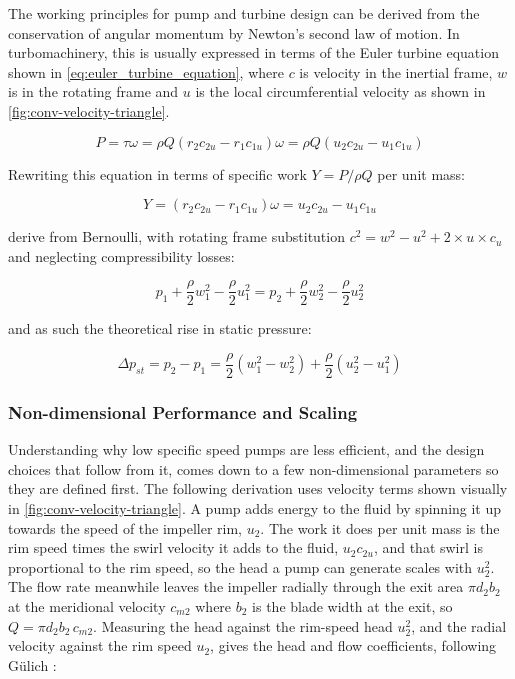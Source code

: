 The working principles for pump and turbine design can be derived from the conservation of angular momentum by Newton's second law of motion. In turbomachinery, this is usually expressed in terms of the Euler turbine equation shown in \cref{eq:euler_turbine_equation}, where $c$ is velocity in the inertial frame, $w$ is in the rotating frame and $u$ is the local circumferential velocity as shown in \cref{fig:conv-velocity-triangle}.

\begin{equation}
    P=\tau\omega=\rho Q \left(r_2 c_{2u} - r_1 c_{1u}\right)\omega=\rho Q\left(u_2c_{2u}-u_1c_{1u}\right)
    \label{eq:euler_turbine_equation}
\end{equation}




Rewriting this equation in terms of specific work $Y=P/\rho Q$ per unit mass:

\begin{equation}
    Y = \left(r_2 c_{2u} - r_1 c_{1u}\right)\omega = u_2c_{2u}-u_1c_{1u}
     \label{eq:euler_specific_work}
\end{equation}

derive from Bernoulli, with rotating frame substitution $c^2=w^2-u^2+2\times u \times c_u$ and neglecting compressibility losses:

$$p_{1}+\frac{\rho}{2}w_{1}^2-\frac{\rho}{2}u_{1}^2=p_{2}+\frac{\rho}{2}w_{2}^2-\frac{\rho}{2}u_{2}^2$$

and as such the theoretical rise in static pressure:

\begin{equation}
    \Delta p_{st} = p_2-p_1 = \frac{\rho}{2}\left(w_1^2-w_2^2\right)+\frac{\rho}{2}\left(u_2^2-u_1^2\right)
    \label{eq:pressure_rise}
\end{equation}

\subsubsection{Non-dimensional Performance and Scaling}
\label{sec:theory_nondim}

Understanding why low specific speed pumps are less efficient, and the design choices that follow from it, comes down to a few non-dimensional parameters so they are defined first. The following derivation uses velocity terms shown visually in \cref{fig:conv-velocity-triangle}. A pump adds energy to the fluid by spinning it up towards the speed of the impeller rim, $u_2$. The work it does per unit mass is the rim speed times the swirl velocity it adds to the fluid, $u_2 c_{2u}$, and that swirl is proportional to the rim speed, so the head a pump can generate scales with $u_2^2$. The flow rate meanwhile leaves the impeller radially through the exit area $\pi d_2 b_2$ at the meridional velocity $c_{m2}$ where $b_2$ is the blade width at the exit, so $Q = \pi d_2 b_2\, c_{m2}$. Measuring the head against the rim-speed head $u_2^2$, and the radial velocity against the rim speed $u_2$, gives the head and flow coefficients, following Gülich \cite{gulichCentrifugalPumps2020}:

